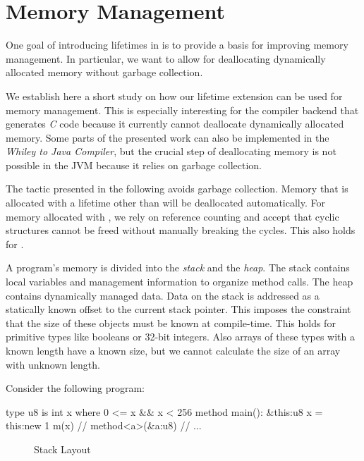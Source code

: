 \section{Memory Management}\label{section:evaluation-memory-management}

One goal of introducing lifetimes in \whiley is to provide a basis for improving memory management.
In particular, we want to allow for deallocating dynamically allocated memory without garbage collection.

We establish here a short study on how our lifetime extension can be used for memory management.
This is especially interesting for the \whiley compiler backend that generates \emph{C} code because it currently cannot deallocate dynamically allocated memory.
Some parts of the presented work can also be implemented in the \emph{Whiley to Java Compiler}, but the crucial step of deallocating memory is not possible in the JVM because it relies on garbage collection.

The tactic presented in the following avoids garbage collection.
Memory that is allocated with a lifetime other than \whileyinline{*} will be deallocated automatically.
For memory allocated with \whileyinline{*}, we rely on reference counting and accept that cyclic structures cannot be freed without manually breaking the cycles.
This also holds for \rust \cite{RustCycles}.

A program's memory is divided into the \emph{stack} and the \emph{heap}.
The stack contains local variables and management information to organize method calls.
The heap contains dynamically managed data.
Data on the stack is addressed as a statically known offset to the current stack pointer.
This imposes the constraint that the size of these objects must be known at compile-time.
This holds for primitive types like booleans or 32-bit integers.
Also arrays of these types with a known length have a known size, but we cannot calculate the size of an array with unknown length.

Consider the following program:

\begin{whileycode}
type u8 is int x where 0 <= x && x < 256
method main():
	&this:u8 x = this:new 1
	m(x) // method<a>(&a:u8)
	// ...
\end{whileycode}

\begin{wrapfigure}{o}{0.3\linewidth}

\caption{Stack Layout}
\label{figure:memory-layout}
\end{wrapfigure}

